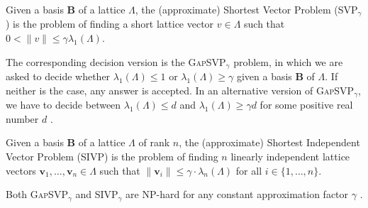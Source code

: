 \begin{definition} \label{def:svp}
    Given a basis $\mathbf{B}$ of a lattice $\Lambda$, the (approximate) Shortest Vector Problem (SVP$_\gamma$) is the problem of finding a short lattice vector $v\in \Lambda$ such that $0 < \| v \| \leq \gamma \lambda_1(\Lambda)$.
\end{definition}

The corresponding decision version is the \textsc{GapSVP}$_\gamma$ problem, in which we are asked to decide whether $\lambda_1(\Lambda) \leq 1$ or $\lambda_1(\Lambda) \geq \gamma$ given a basis $\mathbf{B}$ of $\Lambda$. If neither is the case, any answer is accepted. In an alternative version of \textsc{GapSVP}$_\gamma$, we have to decide between $\lambda_1(\Lambda) \leq d$ and $\lambda_1(\Lambda) \geq \gamma d$ for some positive real number $d$ \cite{LM09}.

\begin{definition} \label{def:sivp}
    Given a basis $\mathbf{B}$ of a lattice $\Lambda$ of rank $n$, the (approximate) Shortest Independent Vector Problem (SIVP) is the problem of finding $n$ linearly independent lattice vectors $\mathbf{v}_1, \ldots, \mathbf{v}_n \in \Lambda$ such that $\|\mathbf{v}_i\| \leq \gamma \cdot \lambda_n(\Lambda)$ for all $i \in \{1, \ldots, n\}$.
\end{definition}

Both \textsc{GapSVP}$_\gamma$ and \textsc{SIVP}$_\gamma$ are NP-hard for any constant approximation factor $\gamma$ \cite{Khot05,BS99}. %




